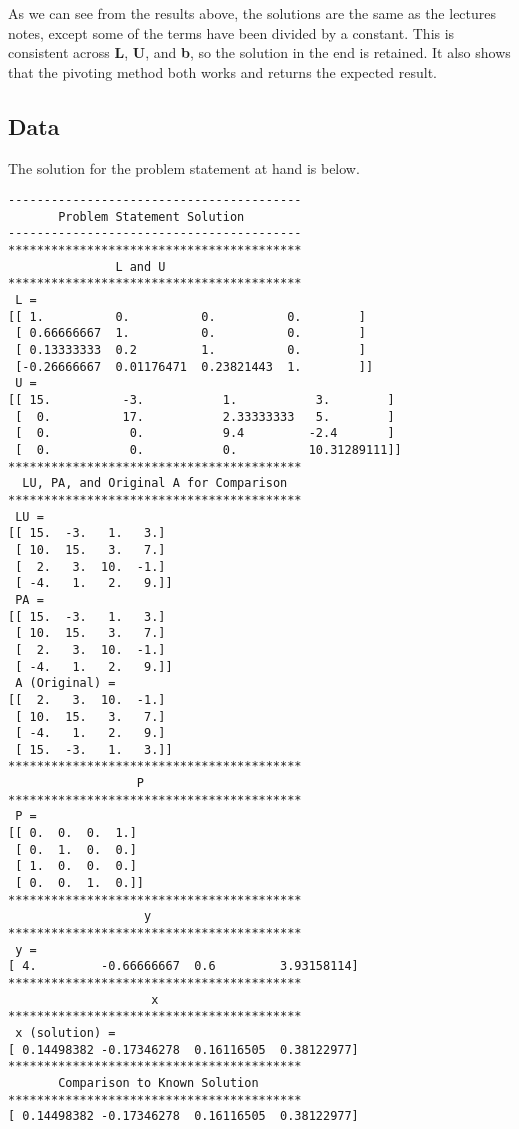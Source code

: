 \documentclass[10pt,letter]{article}
\begin{document}
As we can see from the results above, the solutions are the same as the lectures notes, except some of the terms have been divided by a constant. This is consistent across \textbf{L}, \textbf{U}, and \textbf{b}, so the solution in the end is retained. It also shows that the pivoting method both works and returns the expected result.

\subsection{Data}

The solution for the problem statement at hand is below.

\begin{verbatim}
-----------------------------------------
       Problem Statement Solution        
-----------------------------------------
*****************************************
               L and U                   
*****************************************
 L = 
[[ 1.          0.          0.          0.        ]
 [ 0.66666667  1.          0.          0.        ]
 [ 0.13333333  0.2         1.          0.        ]
 [-0.26666667  0.01176471  0.23821443  1.        ]]
 U = 
[[ 15.          -3.           1.           3.        ]
 [  0.          17.           2.33333333   5.        ]
 [  0.           0.           9.4         -2.4       ]
 [  0.           0.           0.          10.31289111]]
*****************************************
  LU, PA, and Original A for Comparison  
*****************************************
 LU = 
[[ 15.  -3.   1.   3.]
 [ 10.  15.   3.   7.]
 [  2.   3.  10.  -1.]
 [ -4.   1.   2.   9.]]
 PA = 
[[ 15.  -3.   1.   3.]
 [ 10.  15.   3.   7.]
 [  2.   3.  10.  -1.]
 [ -4.   1.   2.   9.]]
 A (Original) = 
[[  2.   3.  10.  -1.]
 [ 10.  15.   3.   7.]
 [ -4.   1.   2.   9.]
 [ 15.  -3.   1.   3.]]
*****************************************
                  P                      
*****************************************
 P = 
[[ 0.  0.  0.  1.]
 [ 0.  1.  0.  0.]
 [ 1.  0.  0.  0.]
 [ 0.  0.  1.  0.]]
*****************************************
                   y                     
*****************************************
 y = 
[ 4.         -0.66666667  0.6         3.93158114]
*****************************************
                    x                    
*****************************************
 x (solution) = 
[ 0.14498382 -0.17346278  0.16116505  0.38122977]
*****************************************
       Comparison to Known Solution      
*****************************************
[ 0.14498382 -0.17346278  0.16116505  0.38122977]





\end{verbatim}
\end{document}

